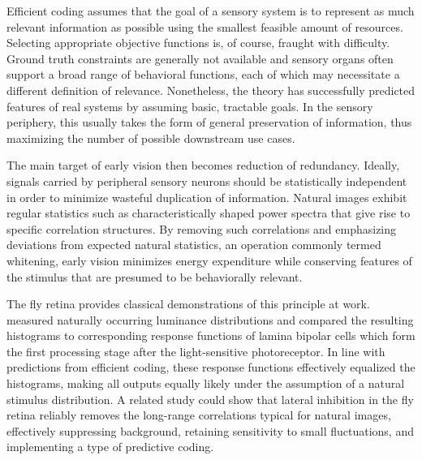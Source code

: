 Efficient coding assumes that the goal of a sensory system is to represent as much relevant information as possible using the smallest feasible amount of resources. Selecting appropriate objective functions is, of course, fraught with difficulty. Ground truth constraints are generally not available and sensory organs often support a broad range of behavioral functions, each of which may necessitate a different definition of relevance. Nonetheless, the theory has successfully predicted features of real systems by assuming basic, tractable goals. In the sensory periphery, this usually takes the form of general preservation of information, thus maximizing the number of possible downstream use cases.

The main target of early vision then becomes reduction of redundancy. Ideally, signals carried by peripheral sensory neurons should be statistically independent in order to minimize wasteful duplication of information. Natural images exhibit regular statistics such as characteristically shaped power spectra that give rise to specific correlation structures. By removing such correlations and emphasizing deviations from expected natural statistics, an operation commonly termed whitening, early vision minimizes energy expenditure while conserving features of the stimulus that are presumed to be behaviorally relevant.

The fly retina provides classical demonstrations of this principle at work. \citet{Laughlin:1981wn} measured naturally occurring luminance distributions and compared the resulting histograms to corresponding response functions of lamina bipolar cells which form the first processing stage after the light-sensitive photoreceptor. In line with predictions from efficient coding, these response functions effectively equalized the histograms, making all outputs equally likely under the assumption of a natural stimulus distribution. A related study \citep{Srinivasan:1982uq} could show that lateral inhibition in the fly retina reliably removes the long-range correlations typical for natural images, effectively suppressing background, retaining sensitivity to small fluctuations, and implementing a type of predictive coding.

